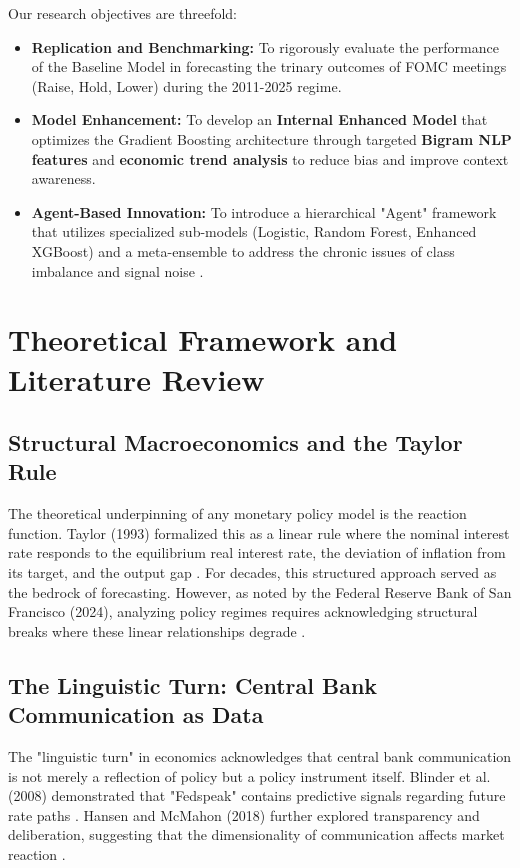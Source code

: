 \documentclass[11pt, a4paper]{article}
\begin{document}
Our research objectives are threefold:
\begin{itemize}
    \item \textbf{Replication and Benchmarking:} To rigorously evaluate the performance of the Baseline Model in forecasting the trinary outcomes of FOMC meetings (Raise, Hold, Lower) during the 2011-2025 regime.
    \item \textbf{Model Enhancement:} To develop an \textbf{Internal Enhanced Model} that optimizes the Gradient Boosting architecture through targeted \textbf{Bigram NLP features} and \textbf{economic trend analysis} to reduce bias and improve context awareness.
    \item \textbf{Agent-Based Innovation:} To introduce a hierarchical "Agent" framework that utilizes specialized sub-models (Logistic, Random Forest, Enhanced XGBoost) and a meta-ensemble to address the chronic issues of class imbalance and signal noise \cite{ref1}.
\end{itemize}

\section{Theoretical Framework and Literature Review}

\subsection{Structural Macroeconomics and the Taylor Rule}
The theoretical underpinning of any monetary policy model is the reaction function. Taylor (1993) formalized this as a linear rule where the nominal interest rate responds to the equilibrium real interest rate, the deviation of inflation from its target, and the output gap \cite{ref3}. For decades, this structured approach served as the bedrock of forecasting. However, as noted by the Federal Reserve Bank of San Francisco (2024), analyzing policy regimes requires acknowledging structural breaks where these linear relationships degrade \cite{ref7}.

\subsection{The Linguistic Turn: Central Bank Communication as Data}
The "linguistic turn" in economics acknowledges that central bank communication is not merely a reflection of policy but a policy instrument itself. Blinder et al. (2008) demonstrated that "Fedspeak" contains predictive signals regarding future rate paths \cite{ref6}. Hansen and McMahon (2018) further explored transparency and deliberation, suggesting that the dimensionality of communication affects market reaction \cite{ref5}.
\end{document}
